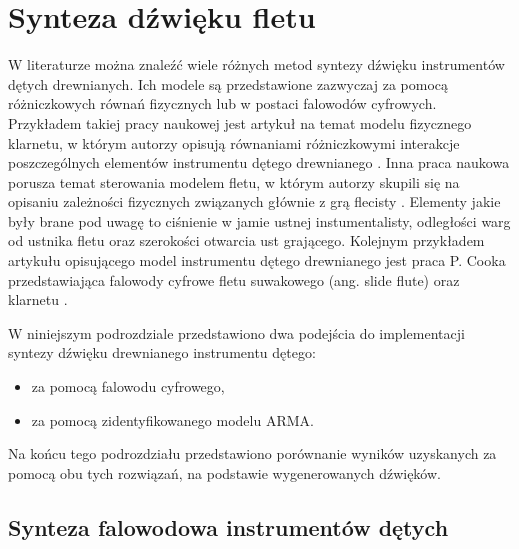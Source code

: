 \section{Synteza dźwięku fletu}

W literaturze można znaleźć wiele różnych metod syntezy dźwięku instrumentów dętych drewnianych. Ich modele są przedstawione zazwyczaj za pomocą różniczkowych równań fizycznych lub w postaci falowodów cyfrowych. 
Przykładem takiej pracy naukowej jest artykuł na temat modelu fizycznego klarnetu, w którym autorzy opisują równaniami różniczkowymi interakcje poszczególnych elementów instrumentu dętego drewnianego \cite{flute_klarnet}. Inna praca naukowa porusza temat sterowania modelem fletu, w którym autorzy skupili się na opisaniu zależności fizycznych związanych głównie z grą flecisty \cite{flute_flecista}. Elementy jakie były brane pod uwagę to ciśnienie w jamie ustnej instumentalisty, odległości warg od ustnika fletu oraz szerokości otwarcia ust grającego. Kolejnym przykładem artykułu opisującego model instrumentu dętego drewnianego jest praca P. Cooka przedstawiająca falowody cyfrowe fletu suwakowego (ang. slide flute) oraz klarnetu \cite{flute_cook}.

W niniejszym podrozdziale przedstawiono dwa podejścia do implementacji syntezy dźwięku drewnianego instrumentu dętego:
\begin{itemize}
	\setlength\itemsep{-3pt}
	\item za pomocą falowodu cyfrowego,
	\item za pomocą zidentyfikowanego modelu ARMA.
\end{itemize}
Na końcu tego podrozdziału przedstawiono porównanie wyników uzyskanych za pomocą obu tych rozwiązań, na podstawie wygenerowanych dźwięków.

\subsection{Synteza falowodowa instrumentów dętych}

